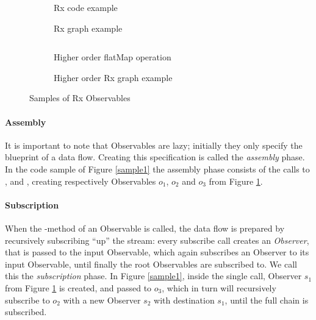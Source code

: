 \begin{figure}[ht!]
    \centering

    \begin{subfigure}[t]
        {\columnwidth} \inputminted[tabsize=2]{javascript}{listings/sample1.js}
        \par
        \bigskip
        \caption{Rx code example}%
        \label{sample1}
        \par
        \medskip
        
        \caption{Rx graph example}%
        \label{chaincreate}
    \end{subfigure}
    \begin{subfigure}[t]
        {\columnwidth} \inputminted[tabsize=2]{javascript}{listings/sample3.js}
        \caption{Higher order flatMap operation}%
        \label{sample3}
        \par
        \medskip
        
        \caption{Higher order Rx graph example}%
        \label{chainhigher}
    \end{subfigure}

    \caption{Samples of Rx Observables}

\end{figure}

\paragraph{Assembly} It is important to note that Observables are lazy;
initially they only specify the blueprint of a data flow.  Creating this
specification is called the \emph{assembly} phase.  In the code sample
of Figure%
\ref{sample1} the assembly phase consists of the calls to ,
 and , creating respectively Observables $ o_1 $,
$ o_2 $ and $ o_3 $ from Figure%
\ref{chaincreate}.

\paragraph{Subscription} When the -method of an
Observable is called, the data flow is prepared by recursively
subscribing ``up'' the stream:  every subscribe call creates an \emph{Observer},
that is passed to the input Observable, which again subscribes an
Observer to its input Observable, until finally the root Observables are
subscribed to.  We call this the \emph{subscription} phase.  In Figure%
\ref{sample1}, inside the single  call, Observer $ s_1 $
from Figure%
\ref{chaincreate} is created, and passed to $ o_3 $, which in turn will
recursively subscribe to $ o_2 $ with a new Observer $ s_2 $ with
destination $ s_1 $, until the full chain is subscribed.

